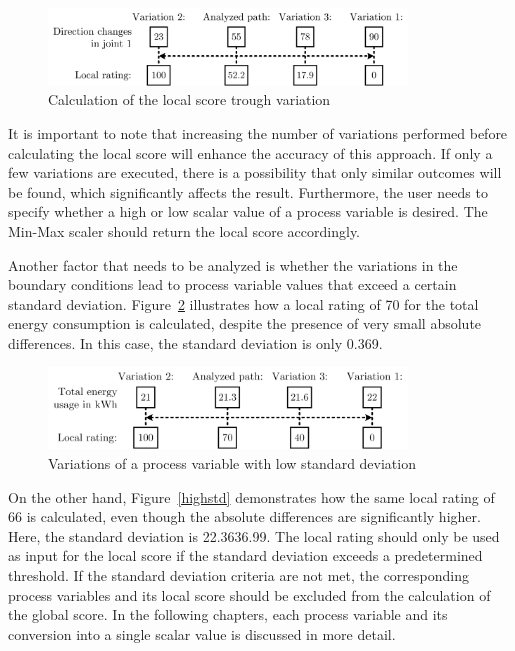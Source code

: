\begin{figure}[H]
	\centerline{\includegraphics[width=0.85\textwidth]{figures/localscore.png}}
	\caption{Calculation of the local score trough variation}
	\label{Localscore}
\end{figure}

It is important to note that increasing the number of variations performed before calculating the local score will enhance the accuracy of this approach. If only a few variations are executed, there is a possibility that only similar outcomes will be found, which significantly affects the result. Furthermore, the user needs to specify whether a high or low scalar value of a process variable is desired. The Min-Max scaler should return the local score accordingly. 

Another factor that needs to be analyzed is whether the variations in the boundary conditions lead to process variable values that exceed a certain standard deviation. Figure~\ref{lowstd} illustrates how a local rating of 70 for the total energy consumption is calculated, despite the presence of very small absolute differences. In this case, the standard deviation is only 0.369.

\begin{figure}[H]
	\centerline{\includegraphics[width=0.85\textwidth]{figures/lowstd.png}}
	\caption{Variations of a process variable with low standard deviation}
	\label{lowstd}
\end{figure}

 On the other hand, Figure~\ref{highstd} demonstrates how the same local rating of 66 is calculated, even though the absolute differences are significantly higher. Here, the standard deviation is 22.3636.99. The local rating should only be used as input for the local score if the standard deviation exceeds a predetermined threshold. If the standard deviation criteria are not met, the corresponding process variables and its local score should be excluded from the calculation of the global score. In the following chapters, each process variable and its conversion into a single scalar value is discussed in more detail. 

